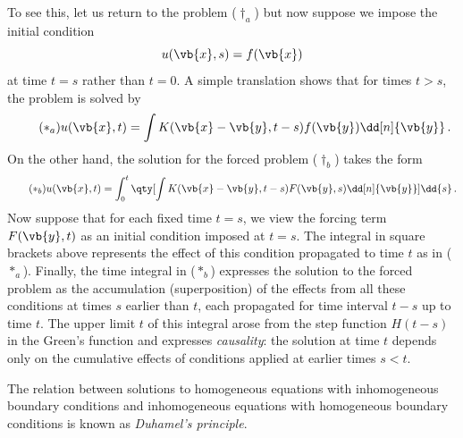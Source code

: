 \documentclass{article}
\theoremstyle{plain}\theoremheaderfont{\normalfont\itshape}\theorembodyfont{\rmfamily}\theoremseparator{.}\newtheorem*{rem}{Remark}\newtheorem*{ex}{Example}\newtheorem*{proof}{Proof}\newtheorem*{altp}{Alternative proof}
\theoremstyle{plain}\theoremheaderfont{\normalfont\bfseries}\theorembodyfont{\rmfamily}\theoremseparator{.}\newtheorem{thm}{Theorem}[section]\newtheorem{lem}[thm]{Lemma}\newtheorem{prop}[thm]{Proposition}\newtheorem*{cor}{Corollary}\newtheorem{defn}[thm]{Definition}\newtheorem{clm}[thm]{Claim}\newtheorem{clminproof}{Claim}
\theoremstyle{break}\theoremheaderfont{\normalfont\itshape}\theorembodyfont{\rmfamily}\theoremseparator{.\medskip}\newtheorem*{proofskip}{Proof}\newtheorem*{exs}{Examples}\newtheorem*{rems}{Remarks}
\theoremstyle{break}\theoremheaderfont{\normalfont\bfseries}\theorembodyfont{\rmfamily}\theoremseparator{.\medskip}\newtheorem{lemskip}[thm]{Lemma}\newtheorem{defnskip}[thm]{Definition}\newtheorem{propskip}[thm]{Proposition}\newtheorem{thmskip}[thm]{Theorem}
\numberwithin{equation}{section}
\begin{document}
	To see this, let us return to the problem (\(\dagger_a\)) but now suppose we impose the initial condition
	\[u(\vb{x},s)=f(\vb{x})\]
	at time \(t=s\) rather than \(t=0\). A simple translation shows that for times \(t>s\), the problem is solved by
	\begin{equation}\tag{\(*_a\)}
		u(\vb{x},t)=\int K(\vb{x}-\vb{y},t-s)f(\vb{y})\dd[n]{\vb{y}}\,.
	\end{equation}
	On the other hand, the solution for the forced problem (\(\dagger_b\)) takes the form
	\begin{equation}\tag{\(*_b\)}
		u(\vb{x},t)=\int_{0}^{t}\qty[\int K(\vb{x}-\vb{y},t-s)F(\vb{y},s)\dd[n]{\vb{y}}]\dd{s}\,.
	\end{equation}
	Now suppose that for each fixed time \(t=s\), we view the forcing term \(F(\vb{y}, t)\) as an initial condition imposed at \(t=s\). The integral in square brackets above represents the effect of this condition propagated to time \(t\) as in (\(*_a\)). Finally, the time integral in (\(*_b\)) expresses the solution to the forced problem as the accumulation (superposition) of the effects from all these conditions at times \(s\) earlier than \(t\), each propagated for time interval \(t-s\) up to time \(t\). The upper limit \(t\) of this integral arose from the step function \(H(t-s)\) in the Green's function and expresses \textit{causality}: the solution at time \(t\) depends only on the cumulative effects of conditions applied at earlier times \(s<t\).

	The relation between solutions to homogeneous equations with inhomogeneous boundary conditions and inhomogeneous equations with homogeneous boundary conditions is known as \textit{Duhamel's principle}.
\end{document}
